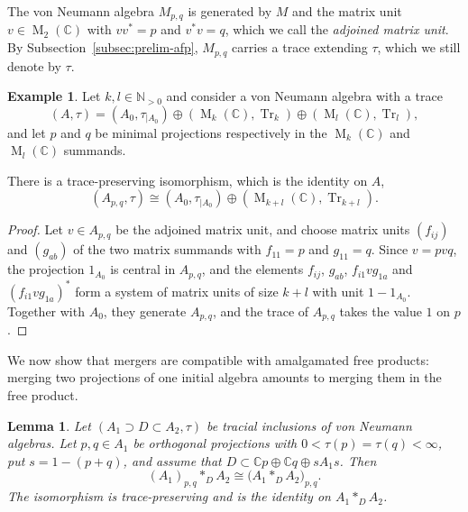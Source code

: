 \documentclass[11pt]{amsart}
\numberwithin{equation}{section}
\newcommand{\nn}{\mathbb N}
\newcommand{\cc}{\mathbb C}
\DeclareMathOperator{\Tr}{Tr}
\newcommand{\rM}{\operatorname{M}}
\newtheorem{Lem}[The]{Lemma}
\theoremstyle{definition}
\newtheorem{Ex}[The]{Example}
\begin{document}
The von Neumann algebra $M_{p,q}$ is generated by $M$ and the matrix unit $v\in\rM_2(\cc)$ with $vv^*=p$ and $v^*v=q$, which we call the \emph{adjoined matrix unit}. By Subsection~\ref{subsec:prelim-afp}, $M_{p,q}$ carries a trace extending $\tau$, which we still denote by $\tau$.

\begin{Ex}
    \label{ex:block-merger}
    Let $k,l\in\nn_{>0}$ and consider a von Neumann algebra with a trace
    $$
        (A,\tau)=(A_0,\tau_{\mid A_0})\oplus(\rM_k(\cc),\Tr_k)\oplus(\rM_l(\cc),\Tr_l),
    $$ and let $p$ and $q$ be minimal projections respectively in the $\rM_k(\cc)$ and $\rM_l(\cc)$ summands.

    There is a trace-preserving isomorphism, which is the identity on $A$,
    $$
        (A_{p,q},\tau)\cong(A_0,\tau_{\mid A_0})\oplus(\rM_{k+l}(\cc),\Tr_{k+l}).
    $$
\end{Ex}
\begin{proof}
    Let $v\in A_{p,q}$ be the adjoined matrix unit, and choose matrix units $(f_{ij})$ and $(g_{ab})$ of the two matrix summands with $f_{11}=p$ and $g_{11}=q$. Since $v=pvq$, the projection $1_{A_0}$ is central in $A_{p,q}$, and the elements $f_{ij}$, $g_{ab}$, $f_{i1}vg_{1a}$ and $(f_{i1}vg_{1a})^*$ form a system of matrix units of size $k+l$ with unit $1-1_{A_0}$. Together with $A_0$, they generate $A_{p,q}$, and the trace of $A_{p,q}$ takes the value $1$ on $p$.
\end{proof}





We now show that mergers are compatible with amalgamated free products: merging two projections of one initial algebra amounts to merging them in the free product.

\begin{Lem}
    \label{lem:outer-fusion}
    Let $(A_1\supset D\subset A_2,\tau)$ be tracial inclusions of von Neumann algebras. Let $p,q\in A_1$ be orthogonal projections with $0<\tau(p)=\tau(q)<\infty$, put $s=1-(p+q)$, and assume that $D\subset\cc p\oplus\cc q\oplus sA_1s$. Then
    \[
        (A_1)_{p,q}\ast_{D}A_2\cong \bigl(A_1\ast_{D}A_2\bigr)_{p,q}.
    \]
    The isomorphism is trace-preserving and is the identity on $A_1\ast_{D}A_2$.
\end{Lem}
\end{document}
